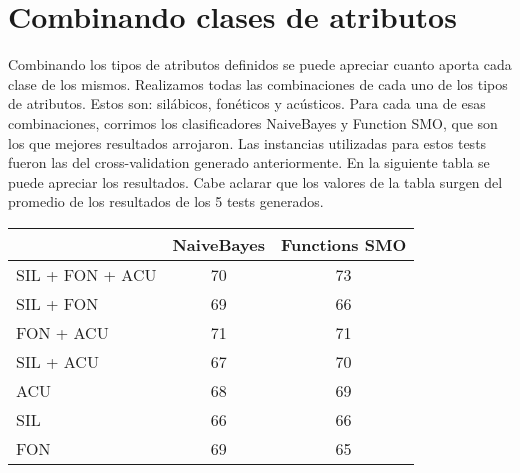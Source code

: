 \section{Combinando clases de atributos}

Combinando los tipos de atributos definidos se puede apreciar cuanto aporta cada clase de los mismos. Realizamos todas las combinaciones de cada uno de los tipos de atributos. Estos son: silábicos, fonéticos y acústicos. Para cada una de esas combinaciones, corrimos los clasificadores NaiveBayes y Function SMO, que son los que mejores resultados arrojaron. Las instancias utilizadas para estos tests fueron las del cross-validation generado anteriormente. En la siguiente tabla se puede apreciar los resultados. Cabe aclarar que los valores de la tabla surgen del promedio de los resultados de los 5 tests generados.  



\begin{table}[H]
\centering
\begin{tabular}{|l|c|c|}
\hline
\textbf{} & \textbf{NaiveBayes} & \textbf{Functions SMO}   \\ \hline
SIL + FON + ACU & 70 & 73 \\ \hline
SIL + FON & 69 & 66 \\ \hline
FON + ACU & 71 & 71 \\ \hline
SIL + ACU & 67 & 70 \\ \hline
ACU & 68 & 69 \\ \hline
SIL & 66 & 66 \\ \hline
FON & 69 & 65 \\ \hline
\end{tabular}
\end{table}



